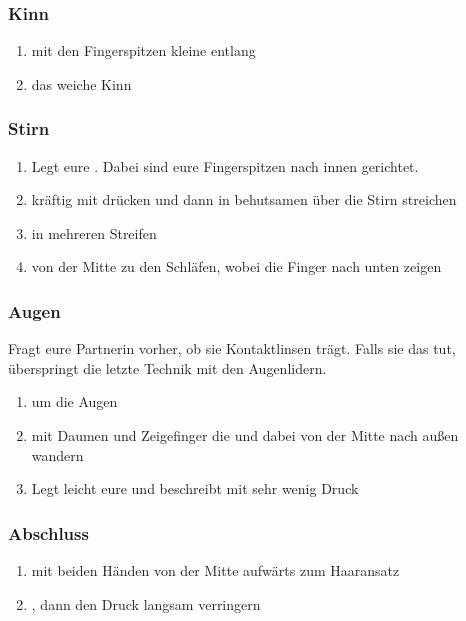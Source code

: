 \subsubsection{Kinn}
\begin{enumerate}
	\item mit den Fingerspitzen kleine  entlang
	\item das weiche Kinn 
\end{enumerate}


\subsubsection{Stirn}

\begin{enumerate}
	\item Legt eure . Dabei sind eure Fingerspitzen nach innen gerichtet.
	\item kräftig mit  drücken und dann in behutsamen  über die Stirn streichen
	\item {} in mehreren Streifen
	\item {} von der Mitte zu den Schläfen, wobei die Finger nach unten zeigen
\end{enumerate}

\subsubsection{Augen}

Fragt eure Partnerin vorher, ob sie Kontaktlinsen trägt. Falls sie das tut, überspringt die letzte Technik mit den Augenlidern.

\begin{enumerate}
	\item {} um die Augen
	\item mit Daumen und Zeigefinger die  und dabei von der Mitte nach außen wandern
	\item Legt leicht eure  und beschreibt mit sehr wenig Druck 
\end{enumerate}


\subsubsection{Abschluss}
\begin{enumerate}
	\item {} mit beiden Händen von der Mitte aufwärts zum Haaransatz
	\item {}, dann den Druck langsam verringern
\end{enumerate}
